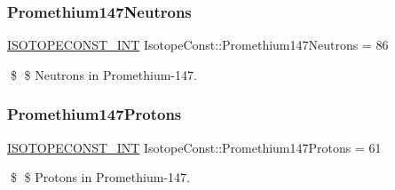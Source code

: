 \subsubsection{\texorpdfstring{Promethium147\+Neutrons}{Promethium147Neutrons}}
{\footnotesize\ttfamily \mbox{\hyperlink{group___isotope_const-_macros_ga5f18360b3e99483a35c32d789e62621c}{I\+S\+O\+T\+O\+P\+E\+C\+O\+N\+S\+T\+\_\+\+I\+NT}} Isotope\+Const\+::\+Promethium147\+Neutrons = 86}

\$ \$ Neutrons in Promethium-\/147. \mbox{\label{group___isotope_const-_promethium-_pm147_ga7069931be025c5ba3787bf8bbf1948e0}} 
\subsubsection{\texorpdfstring{Promethium147\+Protons}{Promethium147Protons}}
{\footnotesize\ttfamily \mbox{\hyperlink{group___isotope_const-_macros_ga5f18360b3e99483a35c32d789e62621c}{I\+S\+O\+T\+O\+P\+E\+C\+O\+N\+S\+T\+\_\+\+I\+NT}} Isotope\+Const\+::\+Promethium147\+Protons = 61}

\$ \$ Protons in Promethium-\/147. 